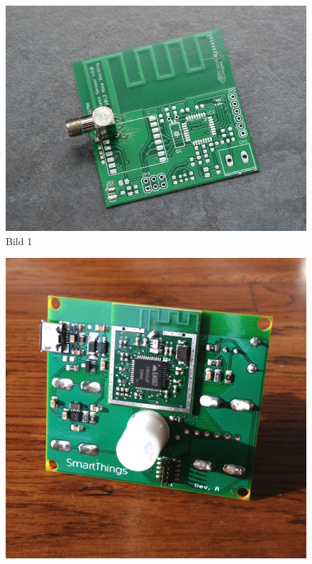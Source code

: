 \documentclass{like}
\begin{document}
 \begin{figure}[h!]
\begin{minipage}[t]{0.3\textwidth}
\includegraphics[width=\textwidth]{Abbildungen/pcb_ant.jpg}
Bild 1
\end{minipage}
\hspace*{0.2cm}
\begin{minipage}[t]{0.3\textwidth}
\includegraphics[width=\textwidth]{Abbildungen/motion-sensor-pcb.jpg}

\end{minipage}
\end{figure}
\end{document}

